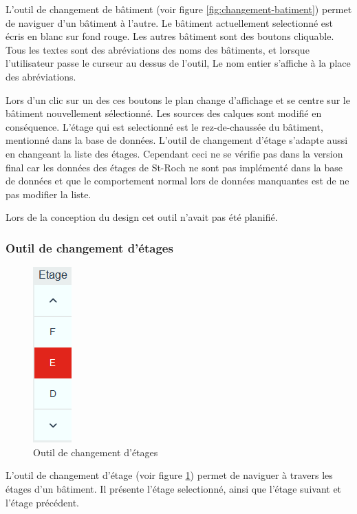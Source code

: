 \documentclass[
    iai, %
    il, %
]{heig-tb}
\begin{document}
L'outil de changement de bâtiment (voir figure \ref{fig:changement-batiment}) permet de naviguer d'un bâtiment à l'autre.
Le bâtiment actuellement selectionné est écris en blanc sur fond rouge. Les autres bâtiment sont des boutons cliquable.
Tous les textes  sont des abréviations des noms des bâtiments, et lorsque l'utilisateur passe le curseur au dessus de l'outil,
Le nom entier s'affiche à la place des abréviations.

Lors d'un clic sur un des ces boutons le plan change d'affichage et se centre sur le bâtiment nouvellement sélectionné.
Les sources des calques sont modifié en conséquence.
L'étage qui est selectionné est le rez-de-chaussée du bâtiment, mentionné dans la base de données.
L'outil de changement d'étage s'adapte aussi en changeant la liste des étages.
Cependant ceci ne se vérifie pas dans la version final car les données des étages de St-Roch ne sont pas implémenté dans la base de données
et que le comportement normal lors de données manquantes est de ne pas modifier la liste.

Lors de la conception du design cet outil n'avait pas été planifié.

\subsubsection{Outil de changement d'étages}

\begin{figure}[h]
    \centering
    \includegraphics[scale=0.8]{frontend-floorChange.png}
    \caption{Outil de changement d'étages}
    \label{fig:changement-étage}
\end{figure}

L'outil de changement d'étage (voir figure \ref{fig:changement-étage}) permet de naviguer à travers les étages d'un bâtiment.
Il présente l'étage selectionné, ainsi que l'étage suivant et l'étage précédent.
\end{document}
